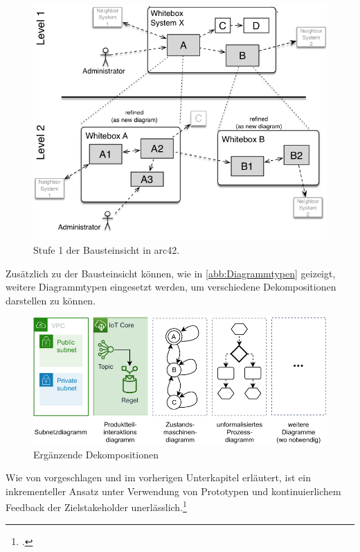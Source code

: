 \begin{figure}[H]
\centering
\includegraphics[height=0.38\textheight]{graphics/Bausteinsicht.png}
\caption[Stufe 1 der Bausteinsicht in arc42]{Stufe 1 der Bausteinsicht in arc42.\footnotemark}
\label{abb:BausteinsichtStufe1}
\end{figure}

Zusätzlich zu der Bausteinsicht können, wie in \autoref{abb:Diagrammtypen} geizeigt, weitere Diagrammtypen eingesetzt werden, um verschiedene Dekompositionen darstellen zu können.

\begin{figure}[H]
\centering
\includegraphics[width=\textwidth]{graphics/Diagrammtypen.pdf}
\caption{Ergänzende Dekompositionen}
\label{abb:Diagrammtypen}
\end{figure}


Wie von \citeauthor{Muller.2020} vorgeschlagen und im vorherigen Unterkapitel erläutert, ist ein inkrementeller Ansatz unter Verwendung von Prototypen und kontinuierlichem Feedback der Zielstakeholder unerlässlich.\footcite[Vgl.][7]{Muller.2020} 

